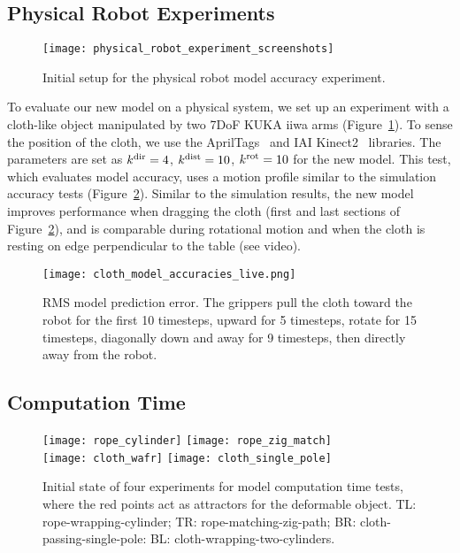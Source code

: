 \subsection{Physical Robot Experiments}

\begin{figure}[ht]
    \centering
    \texttt{[image: physical\_robot\_experiment\_screenshots]}
    \caption{Initial setup for the physical robot model accuracy experiment.}
    \label{fig:physical_experiment_screenshots}
\end{figure}

To evaluate our new model on a physical system, we set up an experiment with a cloth-like object manipulated by two 7DoF KUKA iiwa arms (Figure~\ref{fig:physical_experiment_screenshots}). To sense the position of the cloth, we use the AprilTags~\cite{olson2011tags} and IAI Kinect2~\cite{iai_kinect2} libraries. The parameters are set as $k^\textrm{dir} = 4$, $k^\textrm{dist} = 10$, $k^{\textrm{rot}} = 10$ for the new model. This test, which evaluates model accuracy, uses a motion profile similar to the simulation accuracy tests (Figure~\ref{fig:cloth_model_accuracies_live}). Similar to the simulation results, the new model improves performance when dragging the cloth (first and last sections of Figure~\ref{fig:cloth_model_accuracies_live}), and is comparable during rotational motion and when the cloth is resting on edge perpendicular to the table (see video).

\begin{figure}[ht]
    \centering
    \texttt{[image: cloth\_model\_accuracies\_live.png]}
    \caption{RMS model prediction error. The grippers pull the cloth toward the robot for the first 10 timesteps, upward for 5 timesteps, rotate for 15 timesteps, diagonally down and away for 9 timesteps, then directly away from the robot.}
    \label{fig:cloth_model_accuracies_live}
\end{figure}

\subsection{Computation Time}

\begin{figure}[t]
    \centering
    \texttt{[image: rope\_cylinder]}\hfill
    \texttt{[image: rope\_zig\_match]}\\
    \texttt{[image: cloth\_wafr]}\hfill
    \texttt{[image: cloth\_single\_pole]}%
    \caption{Initial state of four experiments for model computation time tests, where the red points act as attractors for the deformable object. TL: rope-wrapping-cylinder; TR: rope-matching-zig-path; BR: cloth-passing-single-pole: BL: cloth-wrapping-two-cylinders.}
    \label{fig:modelling_timing_tests}
\end{figure}


